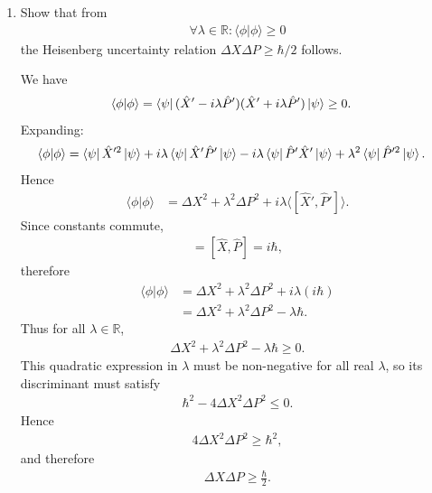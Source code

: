 \documentclass[11pt,a4paper]{scrartcl}
\begin{document}
\begin{enumerate}[label=(\alph*)]
    \item Show that from
    \begin{align*}
        \forall \lambda \in \mathbb{R}: \langle \phi | \phi \rangle \geq 0
    \end{align*}
    the Heisenberg uncertainty relation $\Delta X \Delta P \geq \hbar/2$ follows.
    \begin{calculationbox}
        We have
        \begin{align*}
            \langle \phi | \phi \rangle
            &= \bra{\psi}(\hat{X}' - i \lambda \hat{P}')(\hat{X}' + i \lambda \hat{P}')\ket{\psi}
            \geq 0.
        \end{align*}
        Expanding:
        \begin{align*}
            \langle \phi | \phi \rangle
            &= \bra{\psi}\hat{X}'^2\ket{\psi}
            + i\lambda \bra{\psi}\hat{X}'\hat{P}'\ket{\psi}
            - i\lambda \bra{\psi}\hat{P}'\hat{X}'\ket{\psi}
            + \lambda^2 \bra{\psi}\hat{P}'^2\ket{\psi}.
        \end{align*}
        Hence
        \begin{align*}
            \langle \phi | \phi \rangle
            &= \Delta X^2 + \lambda^2 \Delta P^2 + i\lambda \langle [\hat{X}',\hat{P}'] \rangle.
        \end{align*}
        Since constants commute,
        \begin{align*}
            [\hat{X}',\hat{P}'] = [\hat{X},\hat{P}] = i\hbar,
        \end{align*}
        therefore
        \begin{align*}
            \langle \phi | \phi \rangle
            &= \Delta X^2 + \lambda^2 \Delta P^2 + i\lambda (i\hbar)
            \\
            &= \Delta X^2 + \lambda^2 \Delta P^2 - \lambda \hbar.
        \end{align*}
        Thus for all $\lambda \in \mathbb{R}$,
        \begin{align*}
            \Delta X^2 + \lambda^2 \Delta P^2 - \lambda \hbar \geq 0.
        \end{align*}
        This quadratic expression in $\lambda$ must be non-negative for all real $\lambda$, so its discriminant must satisfy
        \begin{align*}
            \hbar^2 - 4 \Delta X^2 \Delta P^2 \leq 0.
        \end{align*}
        Hence
        \begin{align*}
            4 \Delta X^2 \Delta P^2 \geq \hbar^2,
        \end{align*}
        and therefore
        \begin{align*}
            \Delta X \Delta P \geq \frac{\hbar}{2}.
        \end{align*}
    \end{calculationbox}


\end{enumerate}
\end{document}

